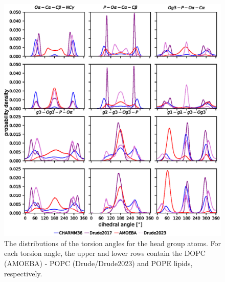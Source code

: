 \documentclass[journal=jacsat,manuscript=article,layout=singlecolumn]{achemso}
\begin{document}
\begin{figure}[!hbt]
	\centering
	\includegraphics{Figures/dihedral_distributions_without_ions.eps}
	\caption{The distributions of the torsion angles for the head group atoms. For each torsion angle, the upper and lower rows contain the DOPC (AMOEBA) - POPC (Drude/Drude2023) and POPE lipids, respectively.}
	\label{fig:dihedral_no_salt}
\end{figure}
\end{document}
